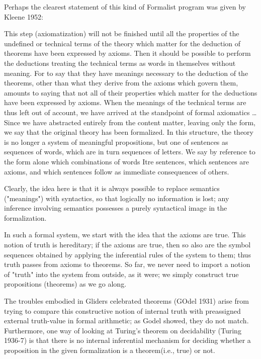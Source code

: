 \documentclass[a4paper,12pt]{article}
\begin{document}
Perhaps the clearest statement of this kind of Formalist program was given by Kleene 1952:

This step (axiomatization) will not be finished until all the properties of the
undefined or technical terms of the theory which matter for the deduction
of theorems have been expressed by axioms. Then it should be possible to
perform the deductions treating the technical terms as words in themselves
without meaning.  For to say that they have meanings necessary to the deduction
of the theorems, other than what they derive from the axioms which
govern them, amounts to saying that not all of their properties which matter
for the deductions have been expressed by axioms. When the meanings
of the technical terms are thus left out of account, we have arrived at the
standpoint of formal axiomatics \ldots Since we have abstracted entirely from
the content matter, leaving only the form, we say that the original theory has
been formalized. In this structure, the theory is no longer a system of meaningful
propositions, but one of sentences as sequences of words, which are
in turn sequences of letters.  We say by reference to the form alone which
combinations of words Itre sentences, which sentences are axioms, and which
sentences follow as immediate consequences of others.

Clearly, the idea here is that it is always possible to replace semantics ("meanings")
with syntactics, so that logically no information is lost; any inference involving semantics
possesses a purely syntactical image in the formalization.

In such a formal system, we start with the idea that the axioms are true.
This notion of truth is hereditary; if the axioms are true, then so also are the
symbol sequences obtained by applying the inferential rules of the system to them;
thus truth passes from axioms to theorems. So far, we never need to import a notion of "truth"
into the system from outside, as it were; we simply construct true propositions (theorems)
as we go along.

The troubles embodied in Gliders celebrated theorems (GOdel 1931)
arise from trying to compare this constructive notion of internal truth with
preassigned external truth-value in formal arithmetic; as Godel showed, they
do not match. Furthermore, one way of looking at Turing's theorem on decidability (Turing 1936-7)
is that there is no internal inferential mechanism for deciding whether a proposition
in the given formalization is a theorem(i.e., true) or not.
\end{document}
